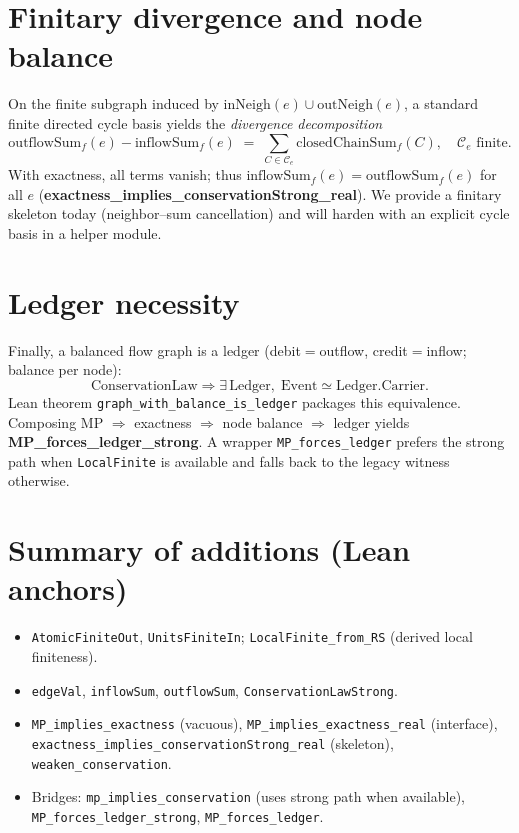 \documentclass[11pt]{article}
\begin{document}
\section{Finitary divergence and node balance}
On the finite subgraph induced by $\mathrm{inNeigh}(e)\cup \mathrm{outNeigh}(e)$, a standard finite directed cycle basis yields the \emph{divergence decomposition}
\[
  \mathrm{outflowSum}_f(e) - \mathrm{inflowSum}_f(e) \;=\; \sum_{C\in\mathcal C_e} \mathrm{closedChainSum}_f(C),\quad \mathcal C_e\text{ finite.}
\]
With exactness, all terms vanish; thus $\mathrm{inflowSum}_f(e)=\mathrm{outflowSum}_f(e)$ for all $e$ (\textbf{exactness\_implies\_conservationStrong\_real}). We provide a finitary skeleton today (neighbor–sum cancellation) and will harden with an explicit cycle basis in a helper module.

\section{Ledger necessity}
Finally, a balanced flow graph is a ledger (debit$=$outflow, credit$=$inflow; balance per node):
\[
  \text{ConservationLaw} \Rightarrow \exists\,\text{Ledger},\; \mathrm{Event} \simeq \text{Ledger.Carrier}.
\]
Lean theorem \texttt{graph\_with\_balance\_is\_ledger} packages this equivalence. Composing MP $\Rightarrow$ exactness $\Rightarrow$ node balance $\Rightarrow$ ledger yields \textbf{MP\_forces\_ledger\_strong}. A wrapper \texttt{MP\_forces\_ledger} prefers the strong path when \texttt{LocalFinite} is available and falls back to the legacy witness otherwise.

\section{Summary of additions (Lean anchors)}
\begin{itemize}[leftmargin=*]
  \item \texttt{AtomicFiniteOut}, \texttt{UnitsFiniteIn}; \texttt{LocalFinite\_from\_RS} (derived local finiteness).
  \item \texttt{edgeVal}, \texttt{inflowSum}, \texttt{outflowSum}, \texttt{ConservationLawStrong}.
  \item \texttt{MP\_implies\_exactness} (vacuous), \texttt{MP\_implies\_exactness\_real} (interface),
        \texttt{exactness\_implies\_conservationStrong\_real} (skeleton), \texttt{weaken\_conservation}.
  \item Bridges: \texttt{mp\_implies\_conservation} (uses strong path when available), \texttt{MP\_forces\_ledger\_strong}, \texttt{MP\_forces\_ledger}.
\end{itemize}
\end{document}
